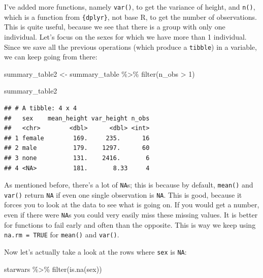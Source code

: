 \documentclass[
]{article}
\newenvironment{Shaded}{\begin{snugshade}}{\end{snugshade}}
\newcommand{\DecValTok}[1]{\textcolor[rgb]{0.00,0.00,0.81}{#1}}
\newcommand{\FunctionTok}[1]{\textcolor[rgb]{0.00,0.00,0.00}{#1}}
\newcommand{\NormalTok}[1]{#1}
\newcommand{\OtherTok}[1]{\textcolor[rgb]{0.56,0.35,0.01}{#1}}
\newcommand{\SpecialCharTok}[1]{\textcolor[rgb]{0.00,0.00,0.00}{#1}}
\begin{document}
I've added more functions, namely \texttt{var()}, to get the variance of height, and \texttt{n()}, which
is a function from \texttt{\{dplyr\}}, not base R, to get the number of observations. This is quite useful,
because we see that there is a group with only one individual. Let's focus on the
sexes for which we have more than 1 individual. Since we save all the previous operations (which
produce a \texttt{tibble}) in a variable, we can keep going from there:

\begin{Shaded}
\begin{Highlighting}[]
\NormalTok{summary\_table2 }\OtherTok{\textless{}{-}}\NormalTok{ summary\_table }\SpecialCharTok{\%\textgreater{}\%}
  \FunctionTok{filter}\NormalTok{(n\_obs }\SpecialCharTok{\textgreater{}} \DecValTok{1}\NormalTok{)}

\NormalTok{summary\_table2}
\end{Highlighting}
\end{Shaded}

\begin{verbatim}
## # A tibble: 4 x 4
##   sex    mean_height var_height n_obs
##   <chr>        <dbl>      <dbl> <int>
## 1 female        169.     235.      16
## 2 male          179.    1297.      60
## 3 none          131.    2416.       6
## 4 <NA>          181.       8.33     4
\end{verbatim}

As mentioned before, there's a lot of \texttt{NA}s; this is because by default, \texttt{mean()} and \texttt{var()}
return \texttt{NA} if even one single observation is \texttt{NA}. This is good, because it forces you to look at
the data to see what is going on. If you would get a number, even if there were \texttt{NA}s you could
very easily miss these missing values. It is better for functions to fail early and often than the
opposite. This is way we keep using \texttt{na.rm\ =\ TRUE} for \texttt{mean()} and \texttt{var()}.

Now let's actually take a look at the rows where \texttt{sex} is \texttt{NA}:

\begin{Shaded}
\begin{Highlighting}[]
\NormalTok{starwars }\SpecialCharTok{\%\textgreater{}\%}
  \FunctionTok{filter}\NormalTok{(}\FunctionTok{is.na}\NormalTok{(sex))}
\end{Highlighting}
\end{Shaded}
\end{document}
